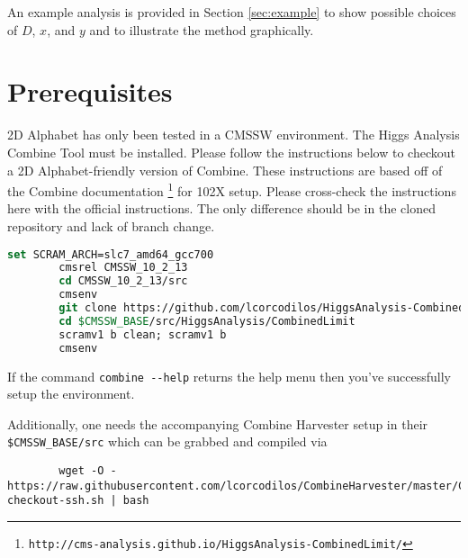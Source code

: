 \documentclass[letter]{article}
\begin{document}
    An example analysis is provided in Section \ref{sec:example} to show possible choices of $D$, $x$, and $y$ and to illustrate the method graphically.

\section{Prerequisites}
    2D Alphabet has only been tested in a CMSSW environment. The Higgs Analysis Combine Tool must be installed. Please follow the instructions below to checkout a 2D Alphabet-friendly version of Combine. These instructions are based off of the Combine documentation \footnote{\verb"http://cms-analysis.github.io/HiggsAnalysis-CombinedLimit/"} for 102X setup. Please cross-check the instructions here with the official instructions. The only difference should be in the cloned repository and lack of branch change.

    \begin{lstlisting}[language=csh]
        set SCRAM_ARCH=slc7_amd64_gcc700
        cmsrel CMSSW_10_2_13
        cd CMSSW_10_2_13/src
        cmsenv
        git clone https://github.com/lcorcodilos/HiggsAnalysis-CombinedLimit.git HiggsAnalysis/CombinedLimit
        cd $CMSSW_BASE/src/HiggsAnalysis/CombinedLimit
        scramv1 b clean; scramv1 b
        cmsenv
    \end{lstlisting}

    If the command \verb"combine --help" returns the help menu then you've successfully setup the environment.

    Additionally, one needs the accompanying Combine Harvester setup in their \verb"$CMSSW_BASE/src" which can be grabbed and compiled via 

    \begin{lstlisting}
        wget -O - https://raw.githubusercontent.com/lcorcodilos/CombineHarvester/master/CombineTools/scripts/sparse-checkout-ssh.sh | bash
    \end{lstlisting}

\end{document}
